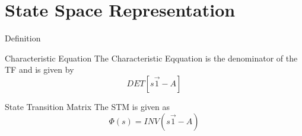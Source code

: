 \documentclass{../templates/topic}
\begin{document}
\chapter{State Space Representation}

\begin{section}{Definition}
\end{section}

\begin{section}{Characteristic Equation}
	The Characteristic Eqquation is the denominator of the TF and is given by
	\begin{equation}
		DET[s\vec1-A]
	\end{equation}
\end{section}

\begin{section}{State Transition Matrix}
	The STM is given as
	\begin{equation}
		\Phi(s)=INV(s\vec{1}-A)
	\end{equation}
\end{section}
\end{document}
